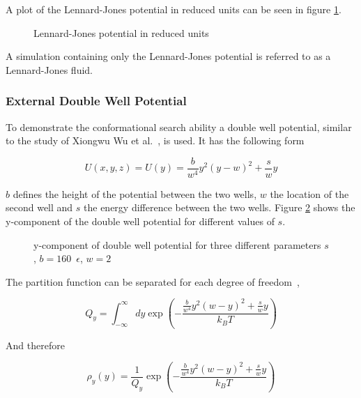 \documentclass[a4paper]{article}
\begin{document}
A plot of the Lennard-Jones potential in reduced units can be seen in figure \ref{im:lennard_jones}.

\begin{figure} [H]
\centering

\caption{Lennard-Jones potential in reduced units}
\label{im:lennard_jones}
\end{figure}


A simulation containing only the Lennard-Jones potential is referred to as a Lennard-Jones fluid.

\subsubsection{External Double Well Potential}

To demonstrate the conformational search ability a double well potential, similar to the study of Xiongwu Wu et al.~\cite{XiongwuWu2011a}, is used. It has the following form

\begin{equation}
U(x,y,z) = U(y) = \frac{b}{w^4} y^2 (y - w)^2 + \frac{s}{w}y
\label{eq:external-double-well}
\end{equation}

$b$ defines the height of the potential between the two wells, $w$ the location of the second well and $s$ the energy difference between the two wells. Figure \ref{im:double_well} shows the y-component of the double well potential for different values of $s$.

\begin{figure} [H]
\centering

\caption{y-component of double well potential for three different parameters $s$, $b = 160 \enspace \epsilon$, $w = 2$~\cite{XiongwuWu2012}}
\label{im:double_well}
\end{figure}

The partition function can be separated for each degree of freedom~\cite{XiongwuWu2012},

\begin{equation}
Q_y = \int_{- \infty}^{\infty} dy \exp \left( - \frac{\frac{b}{w^4} y^2 (w-y)^2 + \frac{s}{w} y}{k_B T} \right)
\label{eq:double-well-partition}
\end{equation}

And therefore

\begin{equation}
\rho_y (y) = \frac{1}{Q_y} \exp \left( - \frac{\frac{b}{w^4} y^2 (w-y)^2 + \frac{s}{w} y}{k_B T} \right)
\label{eq:double-well-something}
\end{equation}
\end{document}
